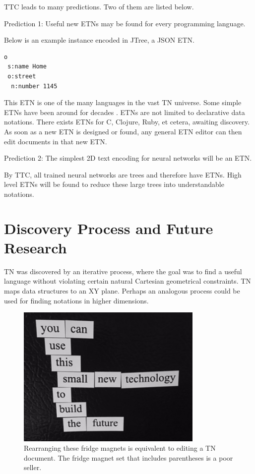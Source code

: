\documentclass[journal]{IEEEtran}
\begin{document}
TTC leads to many predictions. Two of them are listed below.

Prediction 1: Useful new ETNs may be found for every programming language.

Below is an example instance encoded in JTree, a JSON ETN.

\begin{lstlisting}
o
 s:name Home
 o:street
  n:number 1145
\end{lstlisting}

This ETN is one of the many languages in the vast TN universe. Some simple ETNs have been around for decades \cite{Roughan}. ETNs are not limited to declarative data notations. There exists ETNs for C, Clojure, Ruby, et cetera, awaiting discovery. As soon as a new ETN is designed or found, any general ETN editor can then edit documents in that new ETN.

Prediction 2: The simplest 2D text encoding for neural networks will be an ETN.

By TTC,  all trained neural networks are trees and therefore have ETNs. High level ETNs will be found to reduce these large trees into understandable notations.

\section{Discovery Process and Future Research}

TN was discovered by an iterative process, where the goal was to find a useful language without violating certain natural Cartesian geometrical constraints. TN maps data structures to an XY plane. Perhaps an analogous process could be used for finding notations in higher dimensions.

\begin{figure}[ht!]
\centering
\includegraphics[width=90mm]{tree.jpg}
\caption{Rearranging these fridge magnets is equivalent to editing a TN document. The fridge magnet set that includes parentheses is a poor seller.}
\end{figure}
\end{document}
